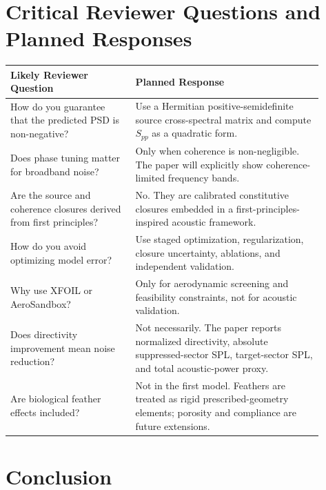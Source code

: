 \documentclass[11pt]{article}
\begin{document}
\section{Critical Reviewer Questions and Planned Responses}

\begin{longtable}{p{0.36\linewidth} p{0.54\linewidth}}
\toprule
\textbf{Likely Reviewer Question} & \textbf{Planned Response} \\
\midrule
\endhead

How do you guarantee that the predicted PSD is non-negative?
&
Use a Hermitian positive-semidefinite source cross-spectral matrix and compute $S_{pp}$ as a quadratic form.
\\

Does phase tuning matter for broadband noise?
&
Only when coherence is non-negligible. The paper will explicitly show coherence-limited frequency bands.
\\

Are the source and coherence closures derived from first principles?
&
No. They are calibrated constitutive closures embedded in a first-principles-inspired acoustic framework.
\\

How do you avoid optimizing model error?
&
Use staged optimization, regularization, closure uncertainty, ablations, and independent validation.
\\

Why use XFOIL or AeroSandbox?
&
Only for aerodynamic screening and feasibility constraints, not for acoustic validation.
\\

Does directivity improvement mean noise reduction?
&
Not necessarily. The paper reports normalized directivity, absolute suppressed-sector SPL, target-sector SPL, and total acoustic-power proxy.
\\

Are biological feather effects included?
&
Not in the first model. Feathers are treated as rigid prescribed-geometry elements; porosity and compliance are future extensions.
\\

\bottomrule
\end{longtable}

\section{Conclusion}
\end{document}
